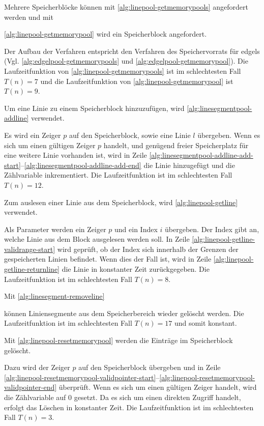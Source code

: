 Mehrere Speicherblöcke können mit \autoref{alg:linepool-getmemorypools} angefordert werden und mit

 \autoref{alg:linepool-getmemorypool} wird ein Speicherblock angefordert.

Der Aufbau der Verfahren entspricht den Verfahren des Speichervorrats für \glspl{edgel}
 (Vgl. \autoref{alg:edgelpool-getmemorypools} und \autoref{alg:edgelpool-getmemorypool}).
Die Laufzeitfunktion von \autoref{alg:linepool-getmemorypools} ist im schlechtesten Fall $T(n) = 7$ und die
 Laufzeitfunktion von \autoref{alg:linepool-getmemorypool} ist $T(n) = 9$.

Um eine Linie zu einem Speicherblock hinzuzufügen, wird \autoref{alg:linesegmentpool-addline} verwendet.

Es wird ein Zeiger $p$ auf den Speicherblock, sowie eine Linie $l$ übergeben. Wenn es sich um einen gültigen Zeiger $p$
 handelt, und genügend freier Speicherplatz für eine weitere Linie vorhanden ist, wird in Zeile
 \ref{alg:linesegmentpool-addline-add-start}--\ref{alg:linesegmentpool-addline-add-end} die Linie hinzugefügt und die
 Zählvariable inkrementiert. Die Laufzeitfunktion ist im schlechtesten Fall $T(n) = 12$.

Zum auslesen einer Linie aus dem Speicherblock, wird \autoref{alg:linepool-getline} verwendet.

Als Parameter werden ein Zeiger $p$ und ein Index $i$ übergeben. Der Index gibt an, welche Linie aus dem Block
 ausgelesen werden soll. In Zeile \ref{alg:linepool-getline-validrange-start} wird geprüft, ob der Index sich innerhalb
 der Grenzen der gespeicherten Linien befindet. Wenn dies der Fall ist, wird in Zeile
 \ref{alg:linepool-getline-returnline} die Linie in konstanter Zeit zurückgegeben. Die Laufzeitfunktion ist im schlechtesten Fall $T(n) = 8$.

Mit \autoref{alg:linesegment-removeline}

können Liniensegmente aus dem Speicherbereich wieder gelöscht werden. Die Laufzeitfunktion ist im schlechtesten Fall
 $T(n) = 17$ und somit konstant.

Mit \autoref{alg:linepool-resetmemorypool} werden die Einträge im Speicherblock gelöscht.

Dazu wird der Zeiger $p$ auf den Speicherblock übergeben und in Zeile
 \ref{alg:linepool-resetmemorypool-validpointer-start}--\ref{alg:linepool-resetmemorypool-validpointer-end} überprüft.
 Wenn es sich um einen gültigen Zeiger handelt, wird die Zählvariable auf $0$ gesetzt. Da es sich um einen direkten
 Zugriff handelt, erfolgt das Löschen in konstanter Zeit. Die Laufzeitfunktion ist im schlechtesten Fall $T(n) = 3$.


